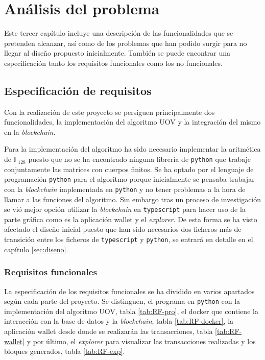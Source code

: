 \chapter{Análisis del problema}

Este tercer capítulo incluye una descripción de las funcionalidades que se pretenden alcanzar, así como de los problemas que han podido surgir para no llegar al diseño propuesto inicialmente. También se puede encontrar una especificación tanto los requisitos funcionales como los no funcionales.

\section{Especificación de requisitos}

Con la realización de este proyecto se persiguen principalmente dos funcionalidades, la implementación del algoritmo UOV y la integración del mismo en la \textit{blockchain}.

Para la implementación del algoritmo ha sido necesario implementar la aritmética de $\mathds{F}_{128}$ puesto que no se ha encontrado ninguna librería de \texttt{python} que trabaje conjuntamente las matrices con cuerpos finitos. Se ha optado por el lenguaje de programación \texttt{python} para el algoritmo porque inicialmente se pensaba trabajar con la \textit{blockchain} implementada en \texttt{python} y no tener problemas a la hora de llamar a las funciones del algoritmo. Sin embargo tras un proceso de investigación se vió mejor opción utilizar la \textit{blockchain} en \texttt{typescript} para hacer uso de la parte gráfica como es la aplicación wallet y el \textit{explorer}. De esta forma se ha visto afectado el diseño inicial puesto que han sido necesarios dos ficheros más de transición entre los ficheros de \texttt{typescript} y \texttt{python}, se entrará en detalle en el capítulo \ref{sec:diseno}.

\subsection{Requisitos funcionales}

La especificación de los requisitos funcionales se ha dividido en varios apartados según cada parte del proyecto. Se distinguen, el programa en \texttt{python} con la implementación del algoritmo UOV, tabla \ref{tab:RF-pro}, el docker que contiene la interacción con la base de datos y la \textit{blockchain}, tabla \ref{tab:RF-docker}, la aplicación wallet desde donde se realizarán las transacciones, tabla \ref{tab:RF-wallet} y por último, el \textit{explorer} para visualizar las transacciones realizadas y los bloques generados, tabla \ref{tab:RF-exp}.

